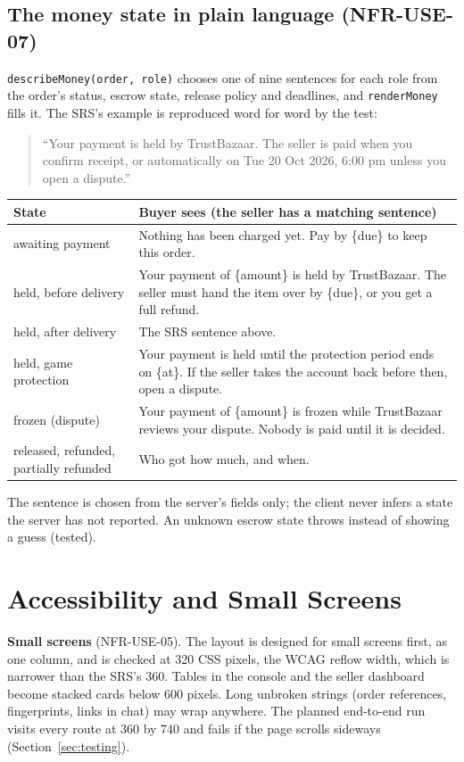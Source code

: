 \documentclass[11pt,a4paper]{article}
\newenvironment{dtable}[1]{\small\begin{longtable}{#1}}{\end{longtable}}
\begin{document}
\subsection{The money state in plain language (NFR-USE-07)}
\label{sec:moneystate}
\texttt{describeMoney(order, role)} chooses one of nine sentences for each role from the order's status, escrow state, release policy and deadlines, and \texttt{renderMoney} fills it. The SRS's example is reproduced word for word by the test:
\begin{quote}\small
``Your payment is held by TrustBazaar. The seller is paid when you confirm receipt, or automatically on Tue 20 Oct 2026, 6:00 pm unless you open a dispute.''
\end{quote}
\begin{dtable}{@{}>{\raggedright\arraybackslash}p{4.2cm}>{\raggedright\arraybackslash}p{11.0cm}@{}}
\toprule
\textbf{State} & \textbf{Buyer sees (the seller has a matching sentence)} \\ \midrule \endhead
awaiting payment & Nothing has been charged yet. Pay by \{due\} to keep this order. \\
held, before delivery & Your payment of \{amount\} is held by TrustBazaar. The seller must hand the item over by \{due\}, or you get a full refund. \\
held, after delivery & The SRS sentence above. \\
held, game protection & Your payment is held until the protection period ends on \{at\}. If the seller takes the account back before then, open a dispute. \\
frozen (dispute) & Your payment of \{amount\} is frozen while TrustBazaar reviews your dispute. Nobody is paid until it is decided. \\
released, refunded, partially refunded & Who got how much, and when. \\
\bottomrule
\end{dtable}
The sentence is chosen from the server's fields only; the client never infers a state the server has not reported. An unknown escrow state throws instead of showing a guess (tested).

\section{Accessibility and Small Screens}
\label{sec:a11y}
\textbf{Small screens} (NFR-USE-05). The layout is designed for small screens first, as one column, and is checked at 320 CSS pixels, the WCAG reflow width, which is narrower than the SRS's 360. Tables in the console and the seller dashboard become stacked cards below 600 pixels. Long unbroken strings (order references, fingerprints, links in chat) may wrap anywhere. The planned end-to-end run visits every route at 360 by 740 and fails if the page scrolls sideways (Section~\ref{sec:testing}).
\end{document}
